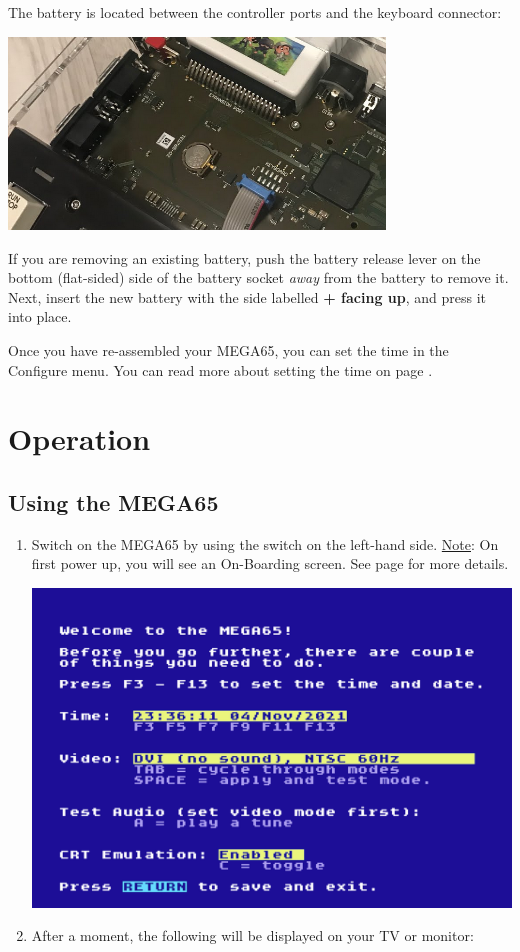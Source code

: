 The battery is located between the controller ports and the keyboard connector:

\includegraphics[width=10cm]{images/rtc-battery-location}

If you are removing an existing battery, push the battery release lever on the bottom (flat-sided) side of the
battery socket \textit{away} from the battery to remove it. Next, insert the new battery with the side labelled
{\bf + facing up}, and press it into place.

Once you have re-assembled your MEGA65, you can set the time in the Configure menu. You can read more about setting
the time on page \pageref{configuring-chipset}.




\section{Operation}

\subsection{Using the MEGA65}

\begin{enumerate}
	\item Switch on the MEGA65 by using the switch on the left-hand side. \newline \newline
    \underline{Note}: On first power up, you will see an On-Boarding screen. See page \pageref{onboarding} for more details. \newline
    \begin{center}%
      \includegraphics[trim= 10mm 140mm 10mm 10mm,clip,width=0.9\linewidth]{images/img011_final_boot_01.png}%
    \end{center}
	\item After a moment, the following will be displayed on your TV or monitor:
\end{enumerate}


